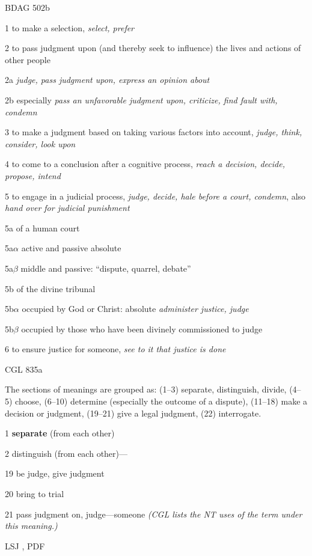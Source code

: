 				\begin{compactdesc}
					\item[BDAG 502b] \textbf{}
						\begin{compactitem}
							\item[1] to make a selection, \textit{select, prefer}
							\item[2] to pass judgment upon (and thereby seek to influence) the lives and actions of other people
							\item[2a] \textit{judge, pass judgment upon, express an opinion about}
							\item[2b] especially \textit{pass an unfavorable judgment upon, criticize, find fault with, condemn}
							\item[3] to make a judgment based on taking various factors into account, \textit{judge, think, consider, look upon}
							\item[4] to come to a conclusion after a cognitive process, \textit{reach a decision, decide, propose, intend}
							\item[5] to engage in a judicial process, \textit{judge, decide, hale before a court, condemn}, also \textit{hand over for judicial punishment}
							\item[5a] of a human court
							\item[5a$\alpha$] active and passive absolute
							\item[5a$\beta$] middle and passive: ``dispute, quarrel, debate''
							\item[5b] of the divine tribunal
							\item[5b$\alpha$] occupied by God or Christ: absolute \textit{administer justice, judge}
							\item[5b$\beta$] occupied by those who have been divinely commissioned to judge
							\item[6] to ensure justice for someone, \textit{see to it that justice is done}
						\end{compactitem}
					\item[CGL 835a] \textbf{}
						\begin{compactitem}
							\item The sections of meanings are grouped as: (1--3) separate, distinguish, divide, (4--5) choose, (6--10) determine (especially the outcome of a dispute), (11--18) make a decision or judgment, (19--21) give a legal judgment, (22) interrogate.
							\item[1] \textbf{separate} (from each other)
							\item[2] distinguish (from each other)---
							\item[19] be judge, give judgment
							\item[20] bring to trial
							\item[21] pass judgment on, judge---someone \textit{(CGL lists the NT uses of the term under this meaning.)}
						\end{compactitem}
					\item[LSJ , PDF ] \textbf{}
						\begin{compactitem}
							\item 
						\end{compactitem}
				\end{compactdesc}
				
